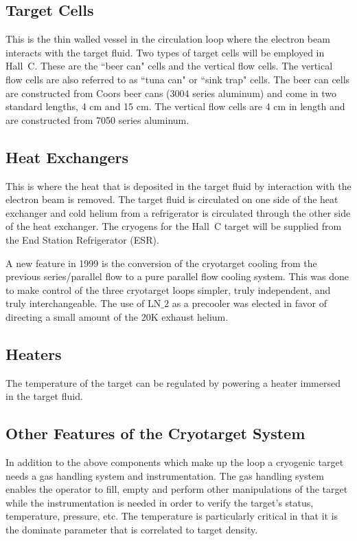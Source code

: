 \subsection{Target Cells} This is the thin walled vessel in the circulation loop
where the electron beam interacts with the target fluid. Two types
of target cells will be employed in Hall~C. These are the ``beer can" cells
and the vertical flow cells. The vertical flow cells are also referred
to as ``tuna can" or ``sink trap" cells.
The beer can cells are constructed from Coors beer cans (3004 series aluminum)
and come in two standard lengths, 4 cm and 15 cm.
The vertical flow cells are 4 cm in length and are constructed from 7050
series aluminum.
\subsection{Heat Exchangers} This is where the heat that is deposited in the target
fluid by interaction with the electron beam is removed. The target fluid is
circulated on one side of the heat exchanger and cold helium
from a refrigerator is circulated through the other side of the heat exchanger.
The cryogens for the Hall~C target will be supplied from the End Station
Refrigerator (ESR).

A new feature in 1999 is the conversion of the cryotarget cooling from
the previous series/parallel flow to a pure parallel flow cooling
system.  This was done to make control of the three cryotarget loops
simpler, truly independent, and truly interchangeable.  The use of
LN$\_2$ as a precooler was elected in favor of directing a small
amount of the 20K exhaust helium.  

\subsection{Heaters} The temperature of the target can be regulated by powering
a heater immersed in the target fluid.

\subsection{Other Features of the Cryotarget System}  In addition to the above components which make up the loop a cryogenic target
needs a gas handling system and instrumentation. The gas handling system
enables the operator to fill, empty and perform other manipulations of the
target while the instrumentation is needed in order to verify the target's
status, temperature, pressure, etc. The temperature is particularly critical
in that it is the dominate parameter that is correlated to target density.

